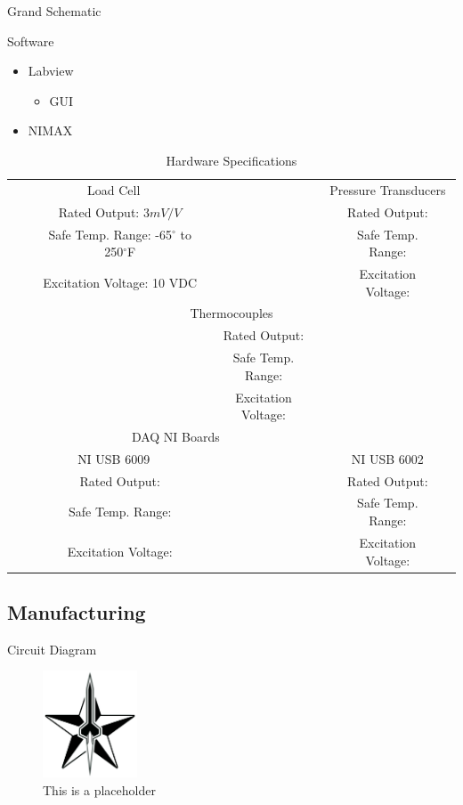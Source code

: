 \documentclass[10pt,a4paper]{article}
\begin{document}
Grand Schematic

Software
\begin{itemize}
	\item Labview
	\begin{itemize}
		\item GUI
	\end{itemize}
	\item NIMAX
\end{itemize}

\newpage


\newcommand{\ra}[1]{\renewcommand{\arraystretch}{#1}}
\begin{table}\centering
	\ra{1.3}
	\begin{tabular}{@{}ccccccc@{}}\toprule
		& \multicolumn{2}{c}{Load Cell} & \phantom{abc}& \multicolumn{3}{c}{Pressure Transducers}\\
		\cmidrule{1-3} \cmidrule{4-6}
		 &&Rated Output: $3mV/V$ &&& Rated Output: \\ &&Safe Temp. Range: -65$^{\circ}$ to 250$^{\circ}$F &&& Safe Temp. Range: \\ &&Excitation Voltage: 10 VDC &&& Excitation Voltage: \\ \midrule
		& \multicolumn{5}{c}{Thermocouples}\\
		\cmidrule{4-5}
		&&& Rated Output: \\ &&& Safe Temp. Range:\\ &&& Excitation Voltage: \\  \midrule \midrule
		& \multicolumn{4}{c}{DAQ NI Boards}\\ \midrule
		& \multicolumn{2}{c}{NI USB 6009} & \phantom{abc}& \multicolumn{3}{c}{NI USB 6002}\\
		\cmidrule{1-3} \cmidrule{4-6}
		&&Rated Output:&&& Rated Output: \\ &&Safe Temp. Range:  &&& Safe Temp. Range: \\ &&Excitation Voltage: &&& Excitation Voltage: \\
		\bottomrule
	\end{tabular}
	\caption{Hardware Specifications}
\end{table}


\subsection{Manufacturing}

Circuit Diagram
\begin{figure}[h!]
	\centering
	\includegraphics[width=0.25\textwidth]{./figs/logo_srt.png}
	\caption{This is a placeholder}
	\label{fig:This is a placeholder}
\end{figure}
\end{document}
